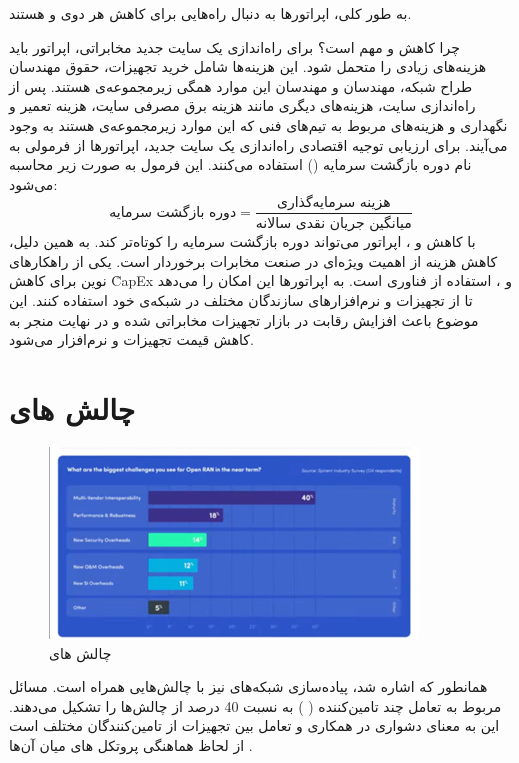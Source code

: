 \documentclass[landscape, 12pt]{report}
\begin{document}
به طور کلی، اپراتورها به دنبال راه‌هایی برای کاهش هر دوی  و  هستند.

چرا کاهش  و  مهم است؟
برای راه‌اندازی یک سایت جدید مخابراتی، اپراتور باید هزینه‌های زیادی را متحمل شود. این هزینه‌ها شامل خرید تجهیزات، حقوق مهندسان طراح شبکه، مهندسان  و مهندسان  این موارد همگی زیرمجموعه‌ی  هستند.
پس از راه‌اندازی سایت، هزینه‌های دیگری مانند هزینه برق مصرفی سایت، هزینه تعمیر و نگهداری و هزینه‌های مربوط به تیم‌های فنی که این موارد زیرمجموعه‌ی  هستند به وجود می‌آیند.
برای ارزیابی توجیه اقتصادی راه‌اندازی یک سایت جدید، اپراتورها از فرمولی به نام دوره بازگشت سرمایه () استفاده می‌کنند. این فرمول به صورت زیر محاسبه می‌شود:
\[
\text{دوره بازگشت سرمایه} = \frac{\text{هزینه سرمایه‌گذاری}}{\text{میانگین جریان نقدی سالانه}}
\]
با کاهش  و ، اپراتور می‌تواند دوره بازگشت سرمایه را کوتاه‌تر کند. به همین دلیل، کاهش هزینه از اهمیت ویژه‌ای در صنعت مخابرات برخوردار است.
یکی از راهکارهای نوین برای کاهش \r{CapEx} و ، استفاده از فناوری  است.  به اپراتورها این امکان را می‌دهد تا از تجهیزات و نرم‌افزارهای سازندگان مختلف در شبکه‌ی خود استفاده کنند. این موضوع باعث افزایش رقابت در بازار تجهیزات مخابراتی شده و در نهایت منجر به کاهش قیمت تجهیزات و نرم‌افزار می‌شود.


\section*{چالش های 
	}
\begin{figure}[ht]
	\centering
	\includegraphics[width=.6\linewidth]{Pic/ORAN_Challenges}
	\caption{چالش های
	}
	\label{fig:ORAN_Challenges}
\end{figure}
همانطور که اشاره شد، پیاده‌سازی
شبکه‌های
  نیز با چالش‌هایی همراه است. مسائل مربوط به تعامل چند تامین‌کننده
(
) 
به نسبت 40 درصد از چالش‌ها را تشکیل می‌دهند. این به معنای دشواری در همکاری و تعامل بین تجهیزات از تامین‌کنندگان مختلف است از لحاظ هماهنگی پروتکل های میان آن‌ها .
\end{document}
